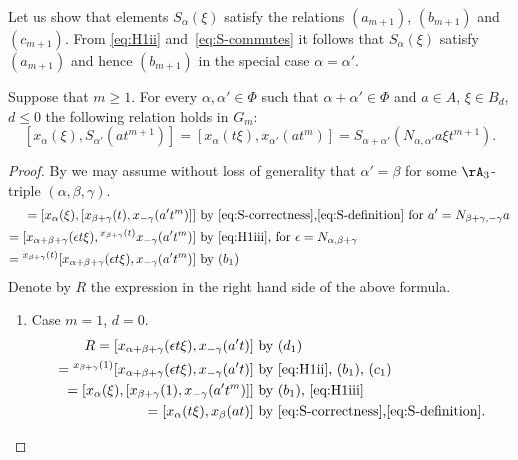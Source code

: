 Let us show that elements $S_\alpha(\xi)$ satisfy the relations $(a_{m+1})$, $(b_{m+1})$ and $(c_{m+1})$.
From \eqref{eq:H1ii} and~\eqref{eq:S-commutes} it follows that $S_\alpha(\xi)$ satisfy $(a_{m+1})$ and hence $(b_{m+1})$ in the special case $\alpha=\alpha'$.
\begin{lemma} \label{lem:cm-plus1} Suppose that $m\geq 1$. For every $\alpha, \alpha' \in \Phi$ such that $\alpha+\alpha' \in \Phi$ and
 $a\in A$, $\xi \in B_d$, $d \leq 0$ the following relation holds in $G_m$: 
\begin{equation} \nonumber
[x_\alpha(\xi), S_{\alpha'}(at^{m+1})] = [x_\alpha(t\xi), x_{\alpha'}(at^m)] = S_{\alpha+\alpha'}(N_{\alpha,\alpha'}a\xi t^{m+1}).
\end{equation}
\end{lemma}
\begin{proof}
By \cite[Lemma~3.1.2]{RS76} we may assume without loss of generality that $\alpha'=\beta$ for some $\rA_3$-triple $(\alpha, \beta, \gamma)$.
\begin{align*}
   [x_\alpha(\xi), S_\beta(at^{m+1})] = [x_\alpha(\xi), [x_{\beta + \gamma}(t), x_{-\gamma}(a't^m)]]
   &  \text{ by~\eqref{eq:S-correctness},\eqref{eq:S-definition} for $a' = N_{\beta+\gamma, -\gamma} a$} \\ 
 = [x_{\alpha+\beta+\gamma}(\epsilon t\xi), {}^{x_{\beta+\gamma}(t)}x_{-\gamma}(a't^m)]             
 &  \text{ by~\eqref{eq:H1iii}, for $\epsilon=N_{\alpha, \beta+\gamma}$} \\
 = {}^{x_{\beta+\gamma}(t)}[x_{\alpha+\beta+\gamma}(\epsilon t\xi), x_{-\gamma}(a't^m)]             
 &  \text{ by $(b_1)$}
\end{align*} 
Denote by $R$ the expression in the right hand side of the above formula.
\begin{enumerate}
 \item \label{case:cm-1} Case $m=1$, $d = 0$.
 \begin{align*}
   R  = [x_{\alpha +\beta + \gamma}(\epsilon t\xi), x_{-\gamma}(a't)] 
   & \text{ by $(d_1)$}\\
      = {}^{x_{\beta+\gamma}(1)}[x_{\alpha +\beta + \gamma}(\epsilon t\xi), x_{-\gamma}(a't)] 
   & \text{ by~\eqref{eq:H1ii}, $(b_1)$, $(c_1)$} \\
      = [x_\alpha(\xi), [x_{\beta + \gamma}(1), x_{-\gamma}(a't^m)]] 
   & \text{ by $(b_1)$, \eqref{eq:H1iii}}\\
      = [x_\alpha(t\xi), x_\beta(at)]
   & \text{ by~\eqref{eq:S-correctness},\eqref{eq:S-definition}.}
 \end{align*}  

\end{enumerate}
\end{proof}
